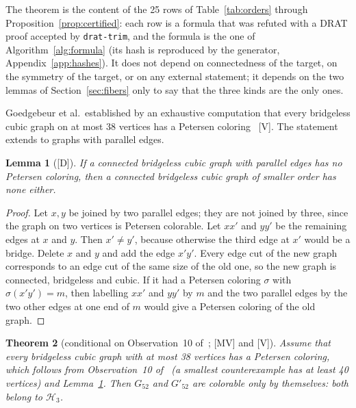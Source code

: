 \documentclass[11pt]{article}
\newtheorem{theorem}{Theorem}[section]
\newtheorem{lemma}[theorem]{Lemma}
\theoremstyle{definition}
\theoremstyle{remark}
\newcommand{\Hthree}{\mathcal{H}_3}
\newcommand{\Ga}{G_{52}}
\newcommand{\Gb}{G'_{52}}
\newcommand{\evD}{\textnormal{[D]}}
\newcommand{\evMV}{\textnormal{[MV]}}
\newcommand{\evV}{\textnormal{[V]}}
\begin{document}
The theorem is the content of the 25 rows of Table~\ref{tab:orders} through Proposition~\ref{prop:certified}: each row is a formula that was
refuted with a DRAT proof accepted by \texttt{drat-trim}, and the formula is the one of Algorithm~\ref{alg:formula} (its hash is reproduced by the generator,
Appendix~\ref{app:hashes}). It does not depend on connectedness of the target, on the symmetry of the target, or on any external statement; it depends on the two lemmas of
Section~\ref{sec:fibers} only to say that the three kinds are the only ones.

Goedgebeur et al.\ established by an exhaustive computation that every bridgeless cubic graph on
at most 38 vertices has a Petersen coloring~\cite[Observation~10]{GJMMMU2026} \evV{}. The statement
extends to graphs with parallel edges.

\begin{lemma}[\evD]\label{lem:digon}
If a connected bridgeless cubic graph with parallel edges has no Petersen coloring, then a
connected bridgeless cubic graph of smaller order has none either.
\end{lemma}

\begin{proof}
Let $x, y$ be joined by two parallel edges; they are not joined by three, since the graph on two
vertices is Petersen colorable. Let $xx'$ and $yy'$ be the remaining edges at $x$ and $y$. Then
$x' \ne y'$, because otherwise the third edge at $x'$ would be a bridge. Delete $x$ and $y$ and
add the edge $x'y'$. Every edge cut of the new graph corresponds to an edge cut of the same size
of the old one, so the new graph is connected, bridgeless and cubic. If it had a Petersen
coloring $\sigma$ with $\sigma(x'y') = m$, then labelling $xx'$ and $yy'$ by $m$ and the two
parallel edges by the two other edges at one end of $m$ would give a Petersen coloring of the
old graph.
\end{proof}

\begin{theorem}[conditional on Observation~10 of~\cite{GJMMMU2026}; \evMV{} and \evV]\label{thm:h3}
Assume that every bridgeless cubic graph with at most 38 vertices has a Petersen coloring, which follows from Observation~10 of~\cite{GJMMMU2026} (a smallest counterexample has at least 40 vertices) and Lemma~\ref{lem:digon}.
Then $\Ga$ and $\Gb$ are colorable only by themselves: both belong to $\Hthree$.
\end{theorem}
\end{document}
